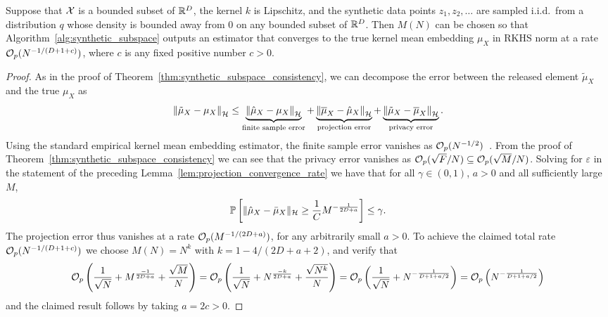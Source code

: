 \begin{hprop}[\ref{prop:alg1_rate_no_publishable_subset}]
Suppose that $\mathcal{X}$ is a bounded subset of $\mathbb{R}^D$, the kernel $k$ is Lipschitz, and the synthetic data points $z_1, z_2, \ldots$ are sampled i.i.d.~from a distribution $q$ whose density is bounded away from $0$ on any bounded subset of $\mathbb{R}^D$. Then $M(N)$ can be chosen so that Algorithm~\ref{alg:synthetic_subspace} outputs an estimator that converges to the true kernel mean embedding $\mu_X$ in RKHS norm at a rate $\mathcal{O}_p(N^{-1/(D+1+c)})$, where $c$ is any fixed positive number $c > 0$.
\begin{proof}
As in the proof of Theorem~\ref{thm:synthetic_subspace_consistency}, we can decompose the error between the released element $\tilde{\mu}_X$ and the true $\mu_X$ as
\begin{equation}
	\left\| \tilde{\mu}_X - \mu_X \right\|_{\mathcal{H}}
	\leq
	\underbrace{
		\left\| \hat{\mu}_X - \mu_X \right\|_{\mathcal{H}}
	}_{\text{finite sample error}}
	+
	\underbrace{
		\left\| \overline{\mu}_X - \hat{\mu}_X \right\|_{\mathcal{H}}
	}_{\text{projection error}}
	+
	\underbrace{
		\left\| \tilde{\mu}_X - \overline{\mu}_X \right\|_{\mathcal{H}}
	}_{\text{privacy error}}
	.
\label{app:eq:error_decomposition}
\end{equation}
Using the standard empirical kernel mean embedding estimator, the finite sample error vanishes as $\mathcal{O}_p(N^{-1/2})$~\citep{muandet_kernel_2016}.
From the proof of Theorem~\ref{thm:synthetic_subspace_consistency} we can see that the privacy error vanishes as $\mathcal{O}_p(\sqrt{F} / N) \subseteq \mathcal{O}_p(\sqrt{M} / N)$.
Solving for $\varepsilon$ in the statement of the preceding Lemma~\ref{lem:projection_convergence_rate} we have that for all $\gamma \in (0, 1)$, $a > 0$ and all sufficiently large $M$,
\begin{equation*}
\mathbb{P}\left[ \| \hat{\mu}_X - \bar{\mu}_X \|_{\mathcal{H}}
\geq
\frac{1}{C} M^{- \frac{1}{2D+a}} \right]
\leq
\gamma.
\end{equation*}
The projection error thus vanishes at a rate $\mathcal{O}_p(M^{-1/(2D+a)})$, for any arbitrarily small $a > 0$. To achieve the claimed total rate $\mathcal{O}_p(N^{-1/(D+1+c)})$ we choose $M(N) = N^k$ with $k = 1 - 4 / (2D + a + 2)$, and verify that
\begin{equation*}
\mathcal{O}_p\left(
\frac{1}{\sqrt{N}}
+
M^{\frac{-1}{2D+a}}
+
\frac{\sqrt{M}}{N}
\right)
=
\mathcal{O}_p\left(
\frac{1}{\sqrt{N}}
+
N^{\frac{-k}{2D+a}}
+
\frac{\sqrt{N^k}}{N}
\right)
=
\mathcal{O}_p\left(
\frac{1}{\sqrt{N}}
+
N^{-\frac{1}{D+1+a/2}}
\right)
=
\mathcal{O}_p\left(
N^{-\frac{1}{D+1+a/2}}
\right)
\end{equation*}
and the claimed result follows by taking $a = 2c > 0$.
\end{proof}
\end{hprop}



